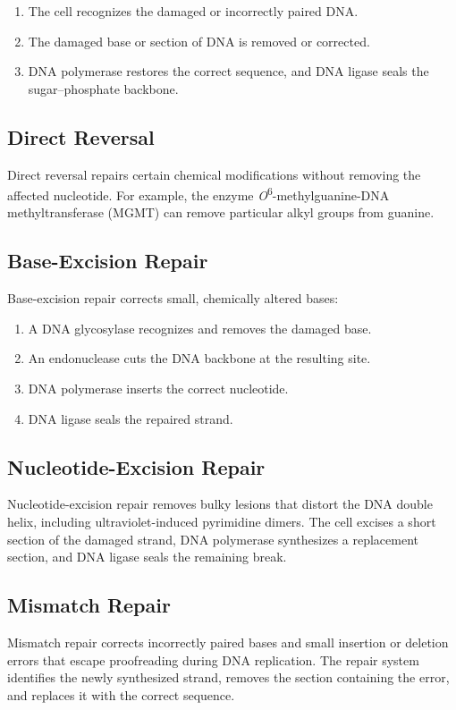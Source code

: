 \documentclass[12pt]{article}
\begin{document}
\begin{enumerate}
    \item The cell recognizes the damaged or incorrectly paired DNA.
    \item The damaged base or section of DNA is removed or corrected.
    \item DNA polymerase restores the correct sequence, and DNA ligase seals
    the sugar--phosphate backbone.
\end{enumerate}

\subsection{Direct Reversal}

Direct reversal repairs certain chemical modifications without removing the
affected nucleotide. For example, the enzyme
\textit{O}\textsuperscript{6}-methylguanine-DNA methyltransferase (MGMT) can
remove particular alkyl groups from guanine.

\subsection{Base-Excision Repair}

Base-excision repair corrects small, chemically altered bases:

\begin{enumerate}
    \item A DNA glycosylase recognizes and removes the damaged base.
    \item An endonuclease cuts the DNA backbone at the resulting site.
    \item DNA polymerase inserts the correct nucleotide.
    \item DNA ligase seals the repaired strand.
\end{enumerate}

\subsection{Nucleotide-Excision Repair}

Nucleotide-excision repair removes bulky lesions that distort the DNA double
helix, including ultraviolet-induced pyrimidine dimers. The cell excises a
short section of the damaged strand, DNA polymerase synthesizes a replacement
section, and DNA ligase seals the remaining break.

\subsection{Mismatch Repair}
Mismatch repair corrects incorrectly paired bases and small insertion or
deletion errors that escape proofreading during DNA replication. The repair
system identifies the newly synthesized strand, removes the section containing
the error, and replaces it with the correct sequence.
\end{document}
